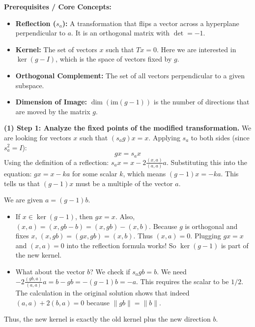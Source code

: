 \begin{solution}
\textbf{Prerequisites / Core Concepts:}
\begin{itemize}
    \item \textbf{Reflection ($s_a$):} A transformation that flips a vector across a hyperplane perpendicular to $a$. It is an orthogonal matrix with $\det = -1$.
    \item \textbf{Kernel:} The set of vectors $x$ such that $Tx = 0$. Here we are interested in $\ker(g - I)$, which is the space of vectors fixed by $g$.
    \item \textbf{Orthogonal Complement:} The set of all vectors perpendicular to a given subspace.
    \item \textbf{Dimension of Image:} $\dim(\text{im}(g-1))$ is the number of directions that are moved by the matrix $g$.
\end{itemize}

\textbf{(1) Step 1: Analyze the fixed points of the modified transformation.}
We are looking for vectors $x$ such that $(s_a g)x = x$. Applying $s_a$ to both sides (since $s_a^2 = I$):
\[ g x = s_a x \]
Using the definition of a reflection: $s_a x = x - 2 \frac{(x, a)}{(a, a)} a$.
Substituting this into the equation: $g x = x - k a$ for some scalar $k$, which means $(g-1)x = -k a$.
This tells us that $(g-1)x$ must be a multiple of the vector $a$.

We are given $a = (g-1)b$.
\begin{itemize}
    \item If $x \in \ker(g-1)$, then $gx = x$. Also, $(x, a) = (x, gb-b) = (x, gb) - (x, b)$. Because $g$ is orthogonal and fixes $x$, $(x, gb) = (gx, gb) = (x, b)$. Thus $(x, a) = 0$.
    Plugging $gx=x$ and $(x,a)=0$ into the reflection formula works! So $\ker(g-1)$ is part of the new kernel.
    \item What about the vector $b$? We check if $s_a g b = b$.
    We need $-2\frac{(gb, a)}{(a, a)} a = b - gb = -(g-1)b = -a$. This requires the scalar to be $1/2$.
    The calculation in the original solution shows that indeed $(a, a) + 2(b, a) = 0$ because $\|gb\| = \|b\|$.
\end{itemize}
Thus, the new kernel is exactly the old kernel plus the new direction $b$.


\end{solution}
